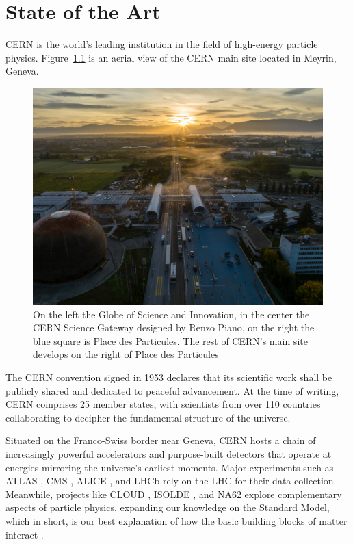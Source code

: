 \chapter{State of the Art}

\ac{CERN} \cite{cern-homepage} is the world's leading institution in the field of high-energy particle physics. Figure~\ref{fig:science-gateway} is an aerial view of the \acs{CERN} main site located in Meyrin, Geneva.

\begin{figure}[htbp]
\centering
\includegraphics[width=\textwidth]{images/introduction/cern.jpg}
\caption{On the left the Globe of Science and Innovation, in the center the CERN Science Gateway designed by Renzo Piano, on the right the blue square is Place des Particules. The rest of CERN's main site develops on the right of Place des Particules \protect\cite{cern_science_gateway}}
\label{fig:science-gateway}
\end{figure}

The \acf{CERN} convention \cite{cern-convention} signed in 1953 declares that its scientific work shall be publicly shared and dedicated to peaceful advancement. At the time of writing, \ac{CERN} comprises 25 member states, with scientists from over 110 countries collaborating to decipher the fundamental structure of the universe.

Situated on the Franco-Swiss border near Geneva, \ac{CERN} hosts a chain of increasingly powerful accelerators and purpose-built detectors that operate at energies mirroring the universe's earliest moments. Major experiments such as \acs{ATLAS} \cite{atlas-experiment}, \acs{CMS} \cite{cms-experiment}, \acs{ALICE} \cite{alice-experiment}, and \acs{LHCb} \cite{lhcb-experiment} rely on the \ac{LHC} \cite{Lebrun:1284331} for their data collection. Meanwhile, projects like \acs{CLOUD} \cite{Kirkby:1310801}, \acs{ISOLDE} \cite{isolde-facility}, and NA62 \cite{Martellotti:2056863} explore complementary aspects of particle physics, expanding our knowledge on the Standard Model, which in short, is our best explanation of how the basic building blocks of matter interact \cite{standard-model}.

